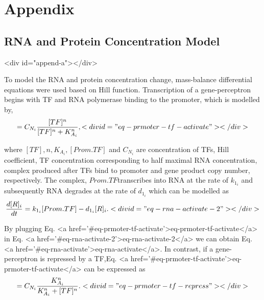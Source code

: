 \documentclass[twocolumn]{biophys-new}
\begin{document}
{{\section{Appendix} 
\subsection{RNA and Protein Concentration Model} <div id="append-a"></div>

To model the RNA and protein concentration change, mass-balance differential equations were used based on Hill function.
Transcription of a gene-perceptron begins with TF and RNA polymerase binding to the promoter,
which is modelled by,
\begin{gather}
[Prom.TF] = C_{N_i} \dfrac{[TF]^n}{[TF]^n + K_{A_i}^n}, <div id="eq-prmoter-tf-activate"></div>

\end{gather}

where $[TF], n, K_{A_i},[Prom.TF]$ and $C_{N_i}$ are concentration of TFs, Hill coefficient, TF concentration corresponding to half maximal RNA concentration, complex produced after TFs bind to promoter and gene product copy number, respectively. 
The complex, $Prom.TF$transcribes into RNA at the rate of $k_{1_i}$ and subsequently RNA degrades at the rate of $d_{1_i}$ which can be modelled as
\begin{gather}
\dfrac{d[R]_i}{dt}= k_{1_i} [Prom.TF]- d_{1_i} [R]_i. <div id="eq-rna-activate-2"></div>
 
\end{gather}

By plugging Eq. <a href='#eq-prmoter-tf-activate'>eq-prmoter-tf-activate</a> in Eq. <a href='#eq-rna-activate-2'>eq-rna-activate-2</a> we can obtain Eq. <a href='#eq-rna-activate'>eq-rna-activate</a>. In contrast, if a gene-perceptron is repressed by a TF,Eq. <a href='#eq-prmoter-tf-activate'>eq-prmoter-tf-activate</a> can be expressed as
\begin{equation}
[Prom.TF]= C_{N_i} \dfrac{K_{A_i}^n}{K_{A_i}^n + [TF]^n}. <div id="eq-prmoter-tf-repress"></div>


\end{equation}}}
\end{document}
